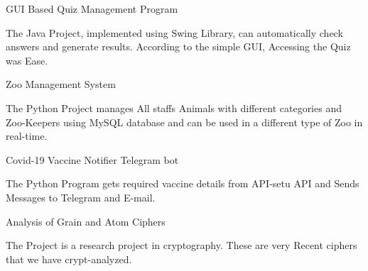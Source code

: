 

\vspace{-3mm}
\begin{itemize}
    \cvproject
    {\item GUI Based Quiz Management Program}
    {
    The Java Project, implemented using Swing Library, can automatically check answers and generate results. According to the simple GUI, Accessing the Quiz was  Ease.
    }
   \cvproject
     {{\item Zoo Management System}}
     {The Python Project manages All staffs Animals with different categories and Zoo-Keepers using MySQL database and can be used in a different type of Zoo in real-time.}
      \cvproject
    {\item Covid-19 Vaccine Notifier Telegram bot}
    {The Python Program gets required vaccine details from API-setu API and Sends Messages to Telegram and E-mail. }
    \cvproject
    {\item Analysis of Grain and Atom Ciphers}
    {The Project is a research project in cryptography. These are very Recent ciphers that we have crypt-analyzed.  }
\vspace{-2mm}
\end{itemize}

